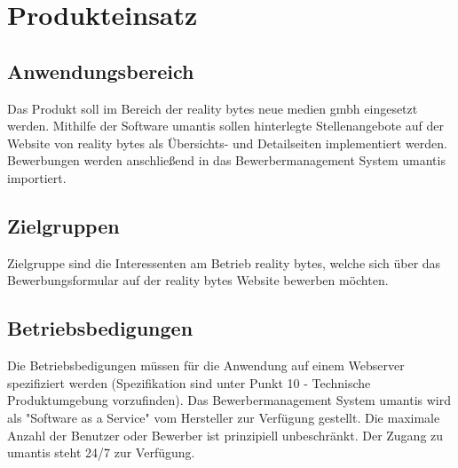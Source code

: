 \section{Produkteinsatz}

    \subsection{Anwendungsbereich}

        Das Produkt soll im Bereich der reality bytes neue medien gmbh eingesetzt werden. Mithilfe der Software umantis sollen hinterlegte Stellenangebote auf der Website von reality bytes als Übersichts- und Detailseiten implementiert werden. Bewerbungen werden anschließend in das Bewerbermanagement System umantis importiert.

    \subsection{Zielgruppen}

        Zielgruppe sind die Interessenten am Betrieb reality bytes, welche sich über das Bewerbungsformular auf der reality bytes Website bewerben möchten.

    \subsection{Betriebsbedigungen}

        Die Betriebsbedigungen müssen für die Anwendung auf einem Webserver spezifiziert werden (Spezifikation sind unter Punkt 10 - Technische Produktumgebung vorzufinden). Das Bewerbermanagement System umantis wird als \gls{"Software as a Service"} vom Hersteller zur Verfügung gestellt. Die maximale Anzahl der Benutzer oder Bewerber ist prinzipiell unbeschränkt. Der Zugang zu umantis steht 24/7 zur Verfügung.